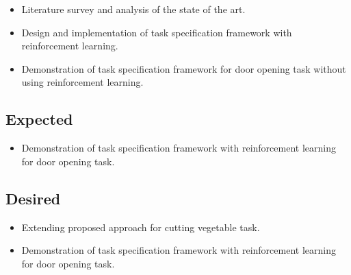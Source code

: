 \documentclass[thesis]{mas_proposal}
\begin{document}
\begin{itemize}
    \item Literature survey and analysis of the state of the art.
    \item Design and implementation of task specification framework with reinforcement learning.
    \item Demonstration of task specification framework for door opening task without using reinforcement learning.
\end{itemize}

\subsection{Expected}
\begin{itemize}
    \item Demonstration of task specification framework with reinforcement learning for door opening task.
\end{itemize}

\subsection{Desired}
\begin{itemize}
	\item Extending proposed approach for cutting vegetable task.
    \item Demonstration of task specification framework with reinforcement learning for door opening task.
\end{itemize}


\nocite{*}

\end{document}
